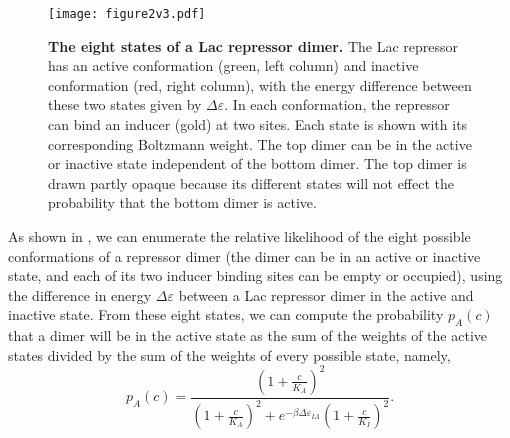 \begin{figure}[h]
	\centering \texttt{[image: figure2v3.pdf]}
	\caption{{\bf The eight states of a Lac repressor dimer. } The Lac repressor has
		an active conformation (green, left column) and inactive conformation (red,
		right column), with the energy difference between these two states given by
		$\Delta \varepsilon$. In each conformation, the repressor can bind an inducer (gold) at
		two sites. Each state is shown with its corresponding Boltzmann weight. The top
		dimer can be in the active or inactive state independent of the bottom dimer.
		The top dimer is drawn partly opaque because its different states will not
		effect the probability that the bottom dimer is active. %
	} \label{figrepressorInducerStates}
\end{figure}

As shown in \fref[figrepressorInducerStates], we can enumerate the relative
likelihood of the eight possible conformations of a repressor dimer (the dimer
can be in an active or inactive state, and each of its two inducer binding sites
can be empty or occupied), using the difference in energy $\Delta \varepsilon$ between a
Lac repressor dimer in the active and inactive state. From these eight states, we can
compute the probability \(p_A(c)\) that a dimer will be in the active state
as the sum of the weights of the active states divided by the sum of the weights
of every possible state, namely,
\begin{equation}\label{eq6}
p_A(c)=\frac{\left(1+\frac{c}{K_A}\right)^2}{\left(1+\frac{c}{K_A}\right)^2+e^{-\beta  \Delta \varepsilon_{IA} }\left(1+\frac{c}{K_I}\right)^2}.
\end{equation}


